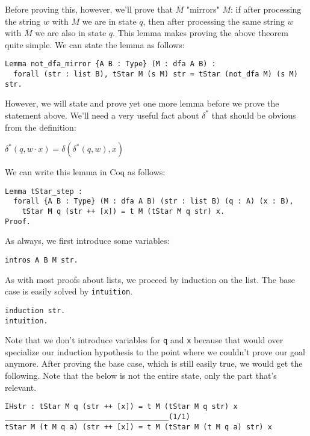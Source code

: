 Before proving this, however, we'll prove that $\overline{M}$ "mirrors" $M$: if after processing the string $w$ with $M$ we are in state $q$, then after processing the same string $w$ with $\overline{M}$ we are also in state $q$.
This lemma makes proving the above theorem quite simple.
We can state the lemma as follows:

\begin{verbatim}
Lemma not_dfa_mirror {A B : Type} (M : dfa A B) :
  forall (str : list B), tStar M (s M) str = tStar (not_dfa M) (s M) str.
\end{verbatim}

However, we will state and prove yet one more lemma before we prove the statement above.
We'll need a very useful fact about $\delta^*$ that should be obvious from the definition:

$\delta^*(q, w \cdot x) = \delta(\delta^*(q, w), x)$

We can write this lemma in Coq as follows:

\begin{verbatim}
Lemma tStar_step :
  forall {A B : Type} (M : dfa A B) (str : list B) (q : A) (x : B),
    tStar M q (str ++ [x]) = t M (tStar M q str) x.
Proof.
\end{verbatim}

As always, we first introduce some variables:

\begin{verbatim}
intros A B M str.
\end{verbatim}

As with most proofs about lists, we proceed by induction on the list.
The base case is easily solved by \texttt{intuition}.

\begin{verbatim}
induction str.
intuition.
\end{verbatim}

Note that we don't introduce variables for \texttt{q} and \texttt{x} because that would over specialize our induction hypothesis to the point where we couldn't prove our goal anymore.
After proving the base case, which is still easily true, we would get the following.
Note that the below is not the entire state, only the part that's relevant.

\begin{verbatim}
IHstr : tStar M q (str ++ [x]) = t M (tStar M q str) x
______________________________________(1/1)
tStar M (t M q a) (str ++ [x]) = t M (tStar M (t M q a) str) x
\end{verbatim}

